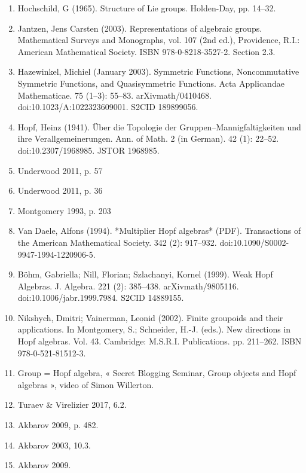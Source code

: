 \begin{enumerate}
\item Hochschild, G (1965). Structure of Lie groups. Holden-Day, pp. 14–32.
\item Jantzen, Jens Carsten (2003). Representations of algebraic groups. Mathematical Surveys and Monographs, vol. 107 (2nd ed.), Providence, R.I.: American Mathematical Society. ISBN 978-0-8218-3527-2. Section 2.3.
\item Hazewinkel, Michiel (January 2003). Symmetric Functions, Noncommutative Symmetric Functions, and Quasisymmetric Functions. Acta Applicandae Mathematicae. 75 (1–3): 55–83. arXiv\:math/0410468. doi:10.1023/A:1022323609001. S2CID 189899056.
\item Hopf, Heinz (1941). Über die Topologie der Gruppen–Mannigfaltigkeiten und ihre Verallgemeinerungen. Ann. of Math. 2 (in German). 42 (1): 22–52. doi:10.2307/1968985. JSTOR 1968985.
\item Underwood 2011, p. 57
\item Underwood 2011, p. 36
\item Montgomery 1993, p. 203
\item Van Daele, Alfons (1994). *Multiplier Hopf algebras* (PDF). Transactions of the American Mathematical Society. 342 (2): 917–932. doi:10.1090/S0002-9947-1994-1220906-5.
\item Böhm, Gabriella; Nill, Florian; Szlachanyi, Kornel (1999). Weak Hopf Algebras. J. Algebra. 221 (2): 385–438. arXiv\:math/9805116. doi:10.1006/jabr.1999.7984. S2CID 14889155.
\item Nikshych, Dmitri; Vainerman, Leonid (2002). Finite groupoids and their applications. In Montgomery, S.; Schneider, H.-J. (eds.). New directions in Hopf algebras. Vol. 43. Cambridge: M.S.R.I. Publications. pp. 211–262. ISBN 978-0-521-81512-3.
\item Group = Hopf algebra, « Secret Blogging Seminar, Group objects and Hopf algebras », video of Simon Willerton.
\item Turaev & Virelizier 2017, 6.2.
\item Akbarov 2009, p. 482.
\item Akbarov 2003, 10.3.
\item Akbarov 2009.
\end{enumerate}
